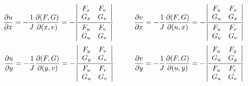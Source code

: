 \documentclass{article} %
\begin{document}
$$
\frac{\partial u}{\partial x}=-\frac{1}{J}\frac{\partial(F,G)}{\partial(x,v)}=
-{\left|\begin{array}{cc}
    F_x & F_v\\
    G_x & G_v\\
\end{array}\right|
\over
\left|\begin{array}{cc}
    F_u & F_v\\
    G_u & G_v\\
\end{array}\right|
}
\hspace{10mm}
\frac{\partial v}{\partial x}=-\frac{1}{J}\frac{\partial(F,G)}{\partial(u,x)}=
-{\left|\begin{array}{cc}
    F_u & F_x\\
    G_u & G_x\\
\end{array}\right|
\over
\left|\begin{array}{cc}
    F_u & F_v\\
    G_u & G_v\\
\end{array}\right|
}
$$
$$
\frac{\partial u}{\partial y}=-\frac{1}{J}\frac{\partial(F,G)}{\partial(y,v)}=
-{\left|\begin{array}{cc}
    F_y & F_v\\
    G_y & G_v\\
\end{array}\right|
\over
\left|\begin{array}{cc}
    F_u & F_v\\
    G_u & G_v\\
\end{array}\right|
}
\hspace{10mm}
\frac{\partial v}{\partial y}=-\frac{1}{J}\frac{\partial(F,G)}{\partial(u,y)}=
-{\left|\begin{array}{cc}
    F_u & F_y\\
    G_u & G_y\\
\end{array}\right|
\over
\left|\begin{array}{cc}
    F_u & F_v\\
    G_u & G_v\\
\end{array}\right|
}
$$
\end{document}
